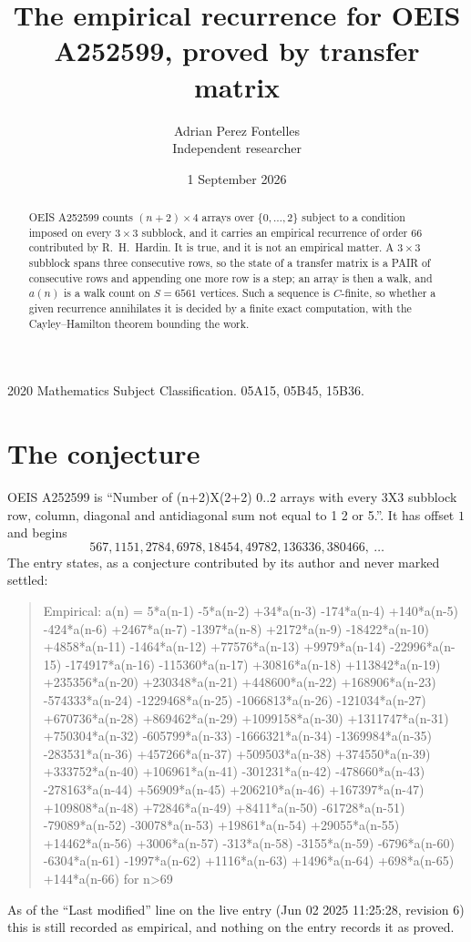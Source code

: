 \documentclass[11pt,a4paper]{article}
\title{The empirical recurrence for OEIS A252599, proved by transfer matrix}
\author{Adrian Perez Fontelles\\ \small Independent researcher}
\date{1 September 2026}
\theoremstyle{plain}
\theoremstyle{definition}
\begin{document}
\maketitle

\begin{abstract}
OEIS A252599 counts $(n+2)\times4$ arrays over $\{0,\dots,2\}$ subject to a condition imposed on
every $3\times3$ subblock, and it carries an empirical recurrence of order $66$
contributed by R.~H.~Hardin. It is true, and it is not an empirical matter. A $3\times3$
subblock spans three consecutive rows, so the state of a transfer matrix is a PAIR of
consecutive rows and appending one more row is a step; an array is then a walk, and
$a(n)$ is a walk count on $S=6561$ vertices. Such a sequence is $C$-finite, so whether a given
recurrence annihilates it is decided by a finite exact computation, with the Cayley--Hamilton
theorem bounding the work.
\end{abstract}

\noindent\small 2020 Mathematics Subject Classification. 05A15, 05B45, 15B36.\normalsize

\section{The conjecture}

OEIS A252599 is ``Number of (n+2)X(2+2) 0..2 arrays with every 3X3 subblock row, column, diagonal and antidiagonal sum not equal to 1 2 or 5.''. It has offset $1$ and begins
\[
567, 1151, 2784, 6978, 18454, 49782, 136336, 380466,\ \dots
\]
The entry states, as a conjecture contributed by its author and never marked settled:
\begin{quote}
Empirical: a(n) = 5*a(n-1) -5*a(n-2) +34*a(n-3) -174*a(n-4) +140*a(n-5) -424*a(n-6) +2467*a(n-7) -1397*a(n-8) +2172*a(n-9) -18422*a(n-10) +4858*a(n-11) -1464*a(n-12) +77576*a(n-13) +9979*a(n-14) -22996*a(n-15) -174917*a(n-16) -115360*a(n-17) +30816*a(n-18) +113842*a(n-19) +235356*a(n-20) +230348*a(n-21) +448600*a(n-22) +168906*a(n-23) -574333*a(n-24) -1229468*a(n-25) -1066813*a(n-26) -121034*a(n-27) +670736*a(n-28) +869462*a(n-29) +1099158*a(n-30) +1311747*a(n-31) +750304*a(n-32) -605799*a(n-33) -1666321*a(n-34) -1369984*a(n-35) -283531*a(n-36) +457266*a(n-37) +509503*a(n-38) +374550*a(n-39) +333752*a(n-40) +106961*a(n-41) -301231*a(n-42) -478660*a(n-43) -278163*a(n-44) +56909*a(n-45) +206210*a(n-46) +167397*a(n-47) +109808*a(n-48) +72846*a(n-49) +8411*a(n-50) -61728*a(n-51) -79089*a(n-52) -30078*a(n-53) +19861*a(n-54) +29055*a(n-55) +14462*a(n-56) +3006*a(n-57) -313*a(n-58) -3155*a(n-59) -6796*a(n-60) -6304*a(n-61) -1997*a(n-62) +1116*a(n-63) +1496*a(n-64) +698*a(n-65) +144*a(n-66) for n>69
\end{quote}
As of the ``Last modified'' line on the live entry (Jun 02 2025 11:25:28, revision 6) this is still
recorded as empirical, and nothing on the entry records it as proved.
\end{document}
